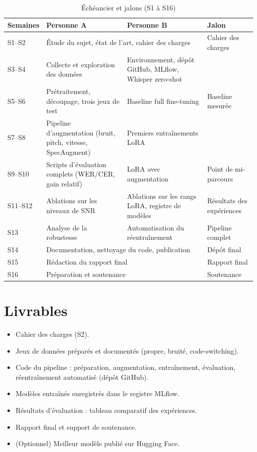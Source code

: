 \documentclass[12pt,a4paper]{report}
\begin{document}
\begin{table}[h]
  \centering
  \small
  \begin{tabularx}{\textwidth}{lXXl}
    \toprule
    \textbf{Semaines} & \textbf{Personne A} & \textbf{Personne B} & \textbf{Jalon} \\
    \midrule
    S1--S2 & \multicolumn{2}{l}{Étude du sujet, état de l'art, cahier des charges}
           & Cahier des charges \\
    \addlinespace
    S3--S4 & Collecte et exploration des données & Environnement, dépôt GitHub,
           MLflow, Whisper zero-shot & \\
    \addlinespace
    S5--S6 & Prétraitement, découpage, trois jeux de test & Baseline full
           fine-tuning & Baseline mesurée \\
    \addlinespace
    S7--S8 & Pipeline d'augmentation (bruit, pitch, vitesse, SpecAugment)
           & Premiers entraînements LoRA & \\
    \addlinespace
    S9--S10 & Scripts d'évaluation complets (WER/CER, gain relatif)
            & LoRA avec augmentation & Point de mi-parcours \\
    \addlinespace
    S11--S12 & Ablations sur les niveaux de SNR & Ablations sur les rangs LoRA,
             registre de modèles & Résultats des expériences \\
    \addlinespace
    S13 & Analyse de la robustesse & Automatisation du réentraînement & Pipeline
        complet \\
    \addlinespace
    S14 & \multicolumn{2}{l}{Documentation, nettoyage du code, publication}
        & Dépôt final \\
    \addlinespace
    S15 & \multicolumn{2}{l}{Rédaction du rapport final} & Rapport final \\
    \addlinespace
    S16 & \multicolumn{2}{l}{Préparation et soutenance} & Soutenance \\
    \bottomrule
  \end{tabularx}
  \caption{Échéancier et jalons (S1 à S16)}
  \label{tab:planning}
\end{table}

\section{Livrables}
\begin{itemize}
  \item Cahier des charges (S2).
  \item Jeux de données préparés et documentés (propre, bruité, code-switching).
  \item Code du pipeline : préparation, augmentation, entraînement, évaluation,
        réentraînement automatisé (dépôt GitHub).
  \item Modèles entraînés enregistrés dans le registre MLflow.
  \item Résultats d'évaluation : tableau comparatif des expériences.
  \item Rapport final et support de soutenance.
  \item (Optionnel) Meilleur modèle publié sur Hugging Face.
\end{itemize}
\end{document}
